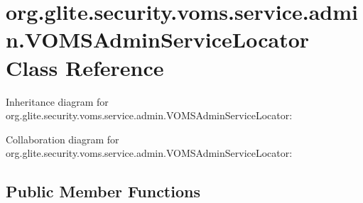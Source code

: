 \hypertarget{classorg_1_1glite_1_1security_1_1voms_1_1service_1_1admin_1_1VOMSAdminServiceLocator}{
\section{org.glite.security.voms.service.admin.VOMSAdminServiceLocator Class Reference}
\label{classorg_1_1glite_1_1security_1_1voms_1_1service_1_1admin_1_1VOMSAdminServiceLocator}
}


Inheritance diagram for org.glite.security.voms.service.admin.VOMSAdminServiceLocator:


Collaboration diagram for org.glite.security.voms.service.admin.VOMSAdminServiceLocator:
\subsection*{Public Member Functions}
